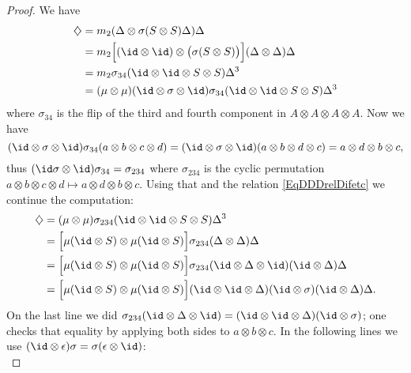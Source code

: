 \begin{proof}
    We have
    \begin{equation}
        \begin{aligned}[]
            \diamondsuit&=m_2(\Delta\otimes\sigma(S\otimes S)\Delta)\Delta\\
            &=m_2\Big[ (\id\otimes\id)\otimes\big( \sigma(S\otimes S) \big) \Big](\Delta\otimes \Delta)\Delta\\
            &=m_2\sigma_{34}(\id\otimes\id\otimes S\otimes S)\Delta^3\\
            &=(\mu\otimes\mu)(\id\otimes\sigma\otimes\id)\sigma_{34}(\id\otimes\id\otimes S\otimes S)\Delta^3
        \end{aligned}
    \end{equation}
    where \( \sigma_{34}\) is the flip of the third and fourth component in \( A\otimes A\otimes A\otimes A\). Now we have
    \begin{equation}
        (\id\otimes\sigma\otimes \id)\sigma_{34}(a\otimes b\otimes c\otimes d)=(\id\otimes\sigma\otimes\id)(a\otimes b\otimes d\otimes c)=a\otimes d\otimes b\otimes c,
    \end{equation}
    thus \( (\id\sigma\otimes \id)\sigma_{34}=\sigma_{234}\) where \( \sigma_{234}\) is the cyclic permutation \( a\otimes b\otimes c\otimes d\mapsto a\otimes d\otimes b\otimes c\). Using that and the relation \eqref{EqDDDrelDifetc} we continue the computation:
    \begin{subequations}
        \begin{align}
            \diamondsuit&=(\mu\otimes\mu)\sigma_{234}(\id\otimes\id\otimes S\otimes S)\Delta^3\\
            &=\Big[ \mu(\id\otimes S)\otimes\mu(\id\otimes S) \Big]\sigma_{234}(\Delta\otimes \Delta)\Delta\\
            &=\Big[ \mu(\id\otimes S)\otimes\mu(\id\otimes S) \Big]\sigma_{234}(\id\otimes\Delta\otimes\id)(\id\otimes\Delta)\Delta\\
            &=\Big[ \mu(\id\otimes S)\otimes\mu(\id\otimes S) \Big](\id\otimes\id\otimes\Delta)(\id\otimes\sigma)   (\id\otimes\Delta)\Delta.
        \end{align}
    \end{subequations}
    On the last line we did \( \sigma_{234}(\id\otimes\Delta\otimes\id)=(\id\otimes\id\otimes\Delta)(\id\otimes\sigma)\); one checks that equality by applying both sides to \( a\otimes b\otimes c\). In the following lines we use \( (\id\otimes\epsilon)\sigma=\sigma(\epsilon\otimes\id)\):
    \begin{subequations}

\end{subequations}
\end{proof}
